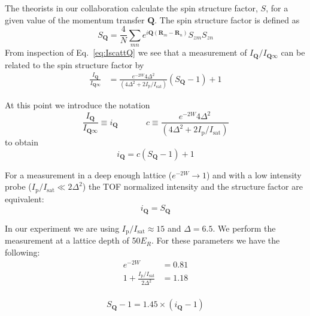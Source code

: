 \documentclass[11pt,letter]{article}
\newcommand{\bv}[1]{\ensuremath{\bm{#1}}}
\newcommand{\iisat}{\ensuremath{I_{\mathrm{p}}/I_{\mathrm{sat}}}}
\newcommand{\Iqtof}{\ensuremath{I_{\bv{Q}\infty} }}
\newcommand{\Iq}{\ensuremath{I_{\bv{Q}} }}
\newcommand{\iq}{\ensuremath{i_{\bv{Q}} }}
\begin{document}
The theorists in our collaboration calculate the spin structure factor, $S$,
for a given value of the momentum transfer $\bv{Q}$.   The spin structure
factor is defined as  
\begin{equation}
   S_{\bv{Q}} =  
      \frac{4}{N}\sum_{mn}  
      e^{ i \bv{Q}( \bv{R}_{m} - \bv{R}_{n} ) } 
      S_{zm}S_{zn}
\end{equation}
From inspection of Eq.~\ref{eq:IscattQ} we see that a measurement of
$\Iq/\Iqtof$ can be related to the spin structure factor by 
\begin{equation}
\begin{split} 
 \frac{\Iq}{\Iqtof} 
&  =
      \frac{ e^{-2W}4 \Delta^{2}  } 
           {(4 \Delta^{2} + 2 \iisat) } 
   \left( S_{\bv{Q}}
     - 1 \right)
  + 1 
\end{split}
\end{equation}

At this point we introduce the notation
\begin{equation}
 \frac{\Iq}{\Iqtof} \equiv \iq 
   \ \ \ \ \ \ \  \ \ \ \ \ \ \ \  
      c \equiv \frac{ e^{-2W}4 \Delta^{2}  } 
           {(4 \Delta^{2} + 2 \iisat) }
\end{equation} 
to obtain
\begin{equation}
  \iq = c ( S_{\bv{Q}} - 1 ) + 1 
\end{equation}

For a measurement in a deep enough lattice ($e^{-2W}\rightarrow 1$) and with a
low intensity probe ($ \iisat \ll 2\Delta^{2} $) the  TOF normalized intensity
and the structure factor are equivalent:
\begin{equation}
  \iq = S_{\bv{Q}} 
\end{equation}

In our experiment we are using $\iisat \approx 15$ and $\Delta = 6.5$.   We
perform the measurement at a lattice depth of 50$E_{R}$.  For these parameters
we have the following: 
\begin{equation}
\begin{split}
  e^{-2W} & =  0.81\\
  1  +   \frac{\iisat}{2\Delta^{2} } & =  1.18\\  
\end{split}
\end{equation} 

\begin{equation} 
  S_{\bv{Q}} - 1  =   1.45 \times (\iq - 1)
\end{equation}
\end{document}

